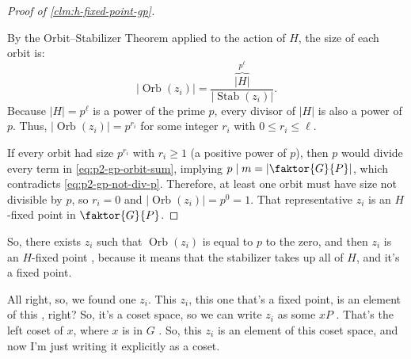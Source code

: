 \begin{proofWrapper}
\begin{content}
\begin{proof}[Proof of \cref{clm:h-fixed-point-gp}]
\begin{center}
\end{center}

By the Orbit--Stabilizer Theorem applied to the action of $H$, the size of each orbit is:
\[
|\operatorname{Orb}(z_i)| = \frac{\overbrace{|H|}^{p^\ell}}{|\operatorname{Stab}(z_i)|}.
\]
Because $|H| = p^\ell$ is a power of the prime $p$, every divisor of $|H|$ is also a power of $p$. Thus, $|\operatorname{Orb}(z_i)| = p^{r_i}$ for some integer $r_i$ with $0 \le r_i \le \ell$.

If every orbit had size $p^{r_i}$ with $r_i \ge 1$ (a positive power of $p$), then $p$ would divide every term in \eqref{eq:p2-gp-orbit-sum}, implying $p \mid m = \left|\faktor{G}{P}\right|$, which contradicts \eqref{eq:p2-gp-not-div-p}. Therefore, at least one orbit must have size not divisible by $p$, so $r_i = 0$ and $|\operatorname{Orb}(z_i)| = p^0 = 1$. That representative $z_i$ is an $H$-fixed point in $\faktor{G}{P}$.
\end{proof}
\end{content}

\begin{hidden}
\end{hidden}

\begin{speech}[00:27:23 - 00:29:23]
So, there exists $z_i$ such that $\operatorname{Orb}(z_i)$ is equal to $p$ to the zero, and then $z_i$ is an $H$-fixed point , because it means that the stabilizer takes up all of $H$, and it's a fixed point.

All right, so, we found one $z_i$. This $z_i$, this one that's a fixed point, is an element of this , right? So, it's a coset space, so we can write $z_i$ as some $x P$ . That's the left coset of $x$, where $x$ is in $G$ . So, this $z_i$ is an element of this coset space, and now I'm just writing it explicitly as a coset.


\end{speech}
\end{proofWrapper}
